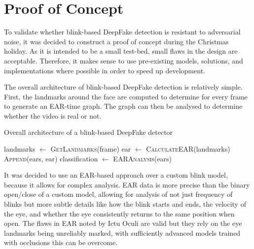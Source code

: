 \section{Proof of Concept}
\label{sec:concept-design}


To validate whether blink-based DeepFake detection is resistant to adversarial noise, it was decided to construct a proof of concept during the Christmas holiday. As it is intended to be a small test-bed, small flaws in the design are acceptable. Therefore, it makes sense to use pre-existing models, solutions, and implementations where possible in order to speed up development.

The overall architecture of blink-based DeepFake detection is relatively simple. First, the landmarks around the face are computed to determine for every frame to generate an EAR-time graph. The graph can then be analysed to determine whether the video is real or not. 

\begin{algorithm}
    \caption{Overall architecture of a blink-based DeepFake detector}
    \label{alg:blink-based}
    \begin{algorithmic}
            \State landmarks $\gets$ \textsc{GetLandmarks}(frame)
            \State ear $\gets$ \textsc{CalculateEAR}(landmarks)
            \State \textsc{Append}(ears, ear)
        \EndFor
        \State classification $\gets$ \textsc{EARAnalysis}(ears)
    \end{algorithmic}
\end{algorithm}

It was decided to use an EAR-based approach over a custom blink model, because it allows for complex analysis. EAR data is more precise than the binary open/close of a custom model, allowing for analysis of not just frequency of blinks but more subtle details like how the blink starts and ends, the velocity of the eye, and whether the eye consistently returns to the same position when open. The flaws in EAR noted by Ictu Oculi\cite{li2018ictu} are valid but they rely on the eye landmarks being unreliably marked, with sufficiently advanced models trained with occlusions this can be overcome. 

